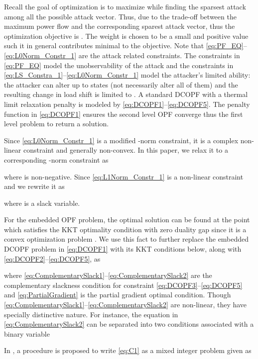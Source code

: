 \documentclass[twocolumn,english,final,journal]{IEEEtran}
\theoremstyle{plain}
\theoremstyle{definition}
\begin{document}
Recall the goal of optimization is to maximize  while finding
the sparsest attack among all the possible attack vector. Thus, due
to the trade-off between the maximum power flow and the corresponding
sparest attack vector, thus the optimization objective is .
The weight  is chosen to be a small and positive value such
it in general contributes minimal to the objective. Note that \eqref{eq:PF_EQ}--\eqref{eq:L0Norm_Constr_1}
are the attack related constraints. The constraints in \eqref{eq:PF_EQ}
model the unobservability of the attack and the constraints in \eqref{eq:LS_Constra_1}--\eqref{eq:L0Norm_Constr_1}
model the attacker's limited ability: the attacker can alter up to
 states (not necessarily alter all of them) and the resulting
change in load shift is limited to . A standard DCOPF
with a thermal limit relaxation penalty is modeled by \eqref{eq:DCOPF1}--\eqref{eq:DCOPF5}.
The penalty function in \eqref{eq:DCOPF1} ensures the second level
OPF converge thus the first level problem to return a solution.

Since \eqref{eq:L0Norm_Constr_1} is a modified -norm constraint,
it is a complex non-linear constraint and generally non-convex. In
this paper, we relax it to a corresponding -norm constraint
as

where  is non-negative. Since \eqref{eq:L1Norm_Constr_1}
is a non-linear constraint and we rewrite it as

where  is a slack variable.

For the embedded OPF problem, the optimal solution can be found at
the point which satisfies the KKT optimality condition with zero duality
gap since it is a convex optimization problem . We use
this fact to further replace the embedded DCOPF problem in \eqref{eq:DCOPF1}
with its KKT conditions below, along with \eqref{eq:DCOPF2}--\eqref{eq:DCOPF5},
as 

where \eqref{eq:ComplementarySlack1}--\eqref{eq:ComplementarySlack2}
are the complementary slackness condition for constraint \eqref{eq:DCOPF3}--\eqref{eq:DCOPF5}
and \eqref{eq:PartialGradient} is the partial gradient optimal condition.
Though \eqref{eq:ComplementarySlack1}--\eqref{eq:ComplementarySlack2}
are non-linear, they have specially distinctive nature. For instance,
the  equation in \eqref{eq:ComplementarySlack2}
can be separated into two conditions associated with a binary variable
 



In , a procedure is proposed to write \eqref{eq:C1}
as a mixed integer problem given as
\end{document}
